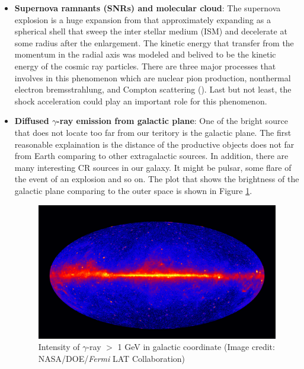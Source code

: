 \begin{itemize}
    \item \textbf{Supernova ramnants (SNRs) and molecular cloud}: 
    The supernova explosion is a huge expansion from that approximately
    expanding as a spherical shell that sweep the inter stellar medium (ISM)
    and decelerate at some radius after the enlargement. The kinetic 
    energy that transfer from the momentum in the radial axis was 
    modeled and belived to be the kinetic energy of the cosmic ray particles.
    There are three major processes that involves in this phenomenon which 
    are nuclear pion production, nonthermal electron bremsstrahlung, and Compton scattering
    (\cite{cr_from_snr_2013}). Last but not least, the shock acceleration
    could play an important role for this phenomenon.

    \item \textbf{Diffused $\gamma$-ray emission from galactic plane}:
    One of the bright source that does not locate too far from our teritory
    is the galactic plane. The first reasonable explaination is the 
    distance of the productive objects does not far from Earth comparing 
    to other extragalactic sources. In addition, there are many interesting 
    CR sources in our galaxy. It might be pulsar, some flare of the 
    event of an explosion and so on. The plot that shows the brightness
    of the galactic plane comparing to the outer space is shown in 
    Figure \ref{fig:gamma_galac_plane}.

    \begin{figure}[h]
        \centering
        \includegraphics[width=\textwidth]{content/background/figures/Fermi_5_years.jpg}
        \caption{Intensity of $\gamma$-ray $>$ 1 GeV in galactic coordinate (Image credit: NASA/DOE/\textit{Fermi} LAT Collaboration)}
        \label{fig:gamma_galac_plane}
    \end{figure}


\end{itemize}
